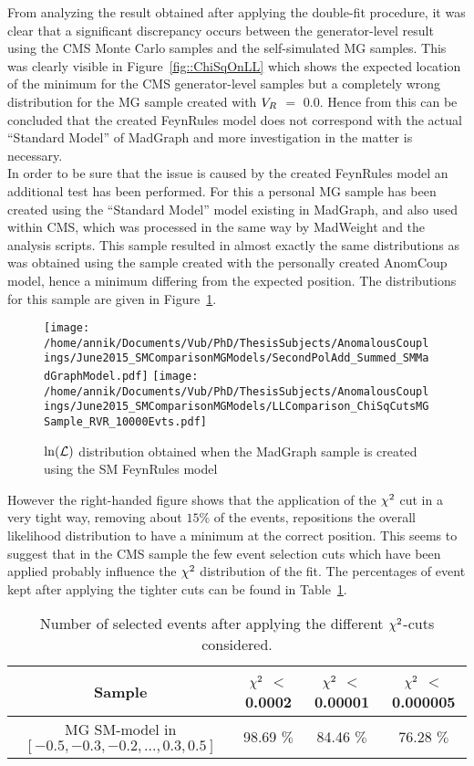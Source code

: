 From analyzing the result obtained after applying the double-fit procedure, it was clear that a significant discrepancy occurs between the generator-level result using the CMS Monte Carlo samples and the self-simulated MG samples.
This was clearly visible in Figure~\ref{fig::ChiSqOnLL} which shows the expected location of the minimum for the CMS generator-level samples but a completely wrong distribution for the MG sample created with $V_{R}$ $=$ $0.0$. Hence from this can be concluded that the created FeynRules model does not correspond with the actual ``Standard Model'' of MadGraph and more investigation in the matter is necessary.
\\

In order to be sure that the issue is caused by the created FeynRules model an additional test has been performed. For this a personal MG sample has been created using the ``Standard Model'' model existing in MadGraph, and also used within CMS, which was processed in the same way by MadWeight and the analysis scripts.
This sample resulted in almost exactly the same distributions as was obtained using the sample created with the personally created AnomCoup model, hence a minimum differing from the expected position. The distributions for this sample are given in Figure~\ref{fig::MGSampleLL}.
\begin{figure}[h!t]
 \centering
 \texttt{[image: /home/annik/Documents/Vub/PhD/ThesisSubjects/AnomalousCouplings/June2015\_SMComparisonMGModels/SecondPolAdd\_Summed\_SMMadGraphModel.pdf]}
 \texttt{[image: /home/annik/Documents/Vub/PhD/ThesisSubjects/AnomalousCouplings/June2015\_SMComparisonMGModels/LLComparison\_ChiSqCutsMGSample\_RVR\_10000Evts.pdf]}
 \caption{$\ln(\mathcal{L})$ distribution obtained when the MadGraph sample is created using the SM FeynRules model}
 \label{fig::MGSampleLL}
\end{figure}

However the right-handed figure shows that the application of the $\chi^{2}$ cut in a very tight way, removing about $15\%$ of the events, repositions the overall likelihood distribution to have a minimum at the correct position. This seems to suggest that in the CMS sample the few event selection cuts which have been applied probably influence the $\chi^{2}$ distribution of the fit.
The percentages of event kept after applying the tighter cuts can be found in Table~\ref{table::tightChiSqMG}.
\begin{table}[h!t]
 \centering
 \caption{Number of selected events after applying the different $\chi^{2}$-cuts considered.} 
 \label{table::tightChiSqMG}
 \begin{tabular}{c|c|c|c}
  Sample 								& $\chi^{2}$ $<$ 0.0002 	& $\chi^{2}$ $<$ 0.00001 	& $\chi^{2}$ $<$ 0.000005 	\\
  \hline
  MG SM-model in $\left[-0.5, -0.3, -0.2, ..., 0.3, 0.5 \right]$ 	& 98.69 $\%$		& 84.46 $\%$		& 76.28 $\%$		
 \end{tabular}
\end{table}

